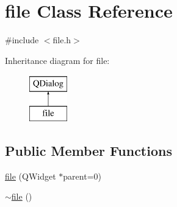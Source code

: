 \hypertarget{classfile}{\section{file Class Reference}
\label{classfile}
}


{\ttfamily \#include $<$file.\-h$>$}

Inheritance diagram for file\-:\begin{figure}[H]
\begin{center}
\leavevmode
\includegraphics[height=2.000000cm]{classfile}
\end{center}
\end{figure}
\subsection*{Public Member Functions}
\begin{DoxyCompactItemize}
\item 
\hyperlink{classfile_aaa4687822d660601b54e35bc124982b3}{file} (Q\-Widget $\ast$parent=0)
\item 
\hyperlink{classfile_a7174566303bcda6dc7d47cc0997c8c42}{$\sim$file} ()
\end{DoxyCompactItemize}
